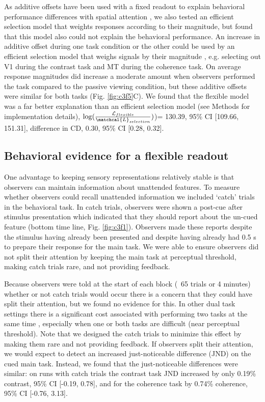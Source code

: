 As additive offsets have been used with a fixed readout to explain behavioral performance differences with spatial attention \citep{Pestilli2011-gi}, we also tested an efficient selection model that weights responses according to their magnitude, but found that this model also could not explain the behavioral performance. An increase in additive offset during one task condition or the other could be used by an efficient selection model that weighs signals by their magnitude \citep{Hara2014-mv,Pestilli2011-gi}, e.g. selecting out V1 during the contrast task and MT during the coherence task. On average response magnitudes did increase a moderate amount when observers performed the task compared to the passive viewing condition, but these additive offsets were similar for both tasks (Fig. \ref{fig:c3f5}C). We found that the flexible model was a far better explanation than an efficient selection model (see Methods for implementation details), $\log(\frac{\mathcal{L}_{flexible}}{\matchcal{L}_{selection}})$)= 130.39, 95\% CI [109.66, 151.31], difference in CD, 0.30, 95\% CI [0.28, 0.32]. 

\subsection{Behavioral evidence for a flexible readout}

One advantage to keeping sensory representations relatively stable is that observers can maintain information about unattended features. To measure whether observers could recall unattended information we included ‘catch’ trials in the behavioral task. In catch trials, observers were shown a post-cue after stimulus presentation which indicated that they should report about the un-cued feature (bottom time line, Fig. \ref{fig:c3f1}). Observers made these reports despite the stimulus having already been presented and despite having already had 0.5 s to prepare their response for the main task. We were able to ensure observers did not split their attention by keeping the main task at perceptual threshold, making catch trials rare, and not providing feedback.

Because observers were told at the start of each block (~65 trials or 4 minutes) whether or not catch trials would occur there is a concern that they could have split their attention, but we found no evidence for this. In other dual task settings there is a significant cost associated with performing two tasks at the same time \citep{Sperling1978-li}, especially when one or both tasks are difficult (near perceptual threshold). Note that we designed the catch trials to minimize this effect by making them rare and not providing feedback. If observers split their attention, we would expect to detect an increased just-noticeable difference (JND) on the cued main task. Instead, we found that the just-noticeable differences were similar: on runs with catch trials the contrast task JND increased by only 0.19\% contrast, 95\% CI [-0.19, 0.78], and for the coherence task by 0.74\% coherence, 95\% CI [-0.76, 3.13].  

